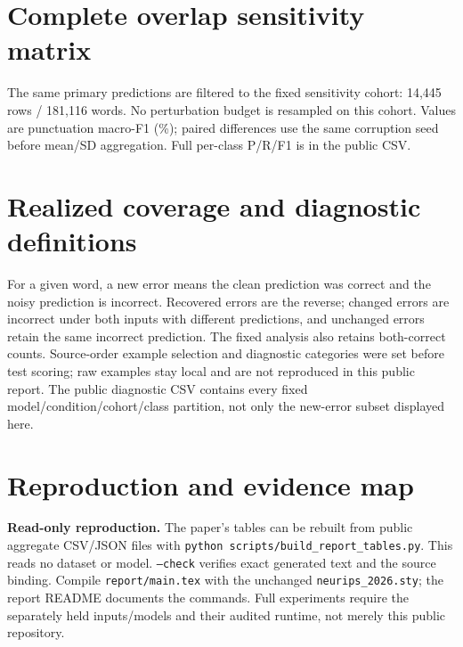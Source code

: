 \documentclass{article}
\begin{document}
\clearpage
\appendix
\section{Complete overlap sensitivity matrix}\label{app:sensitivity}
The same primary predictions are filtered to the fixed sensitivity cohort:
14,445 rows / 181,116 words. No perturbation budget is resampled on this cohort.
Values are punctuation macro-F1 (\%); paired differences use the same corruption
seed before mean/SD aggregation. Full per-class P/R/F1 is in the public CSV.
\begin{table}[h]
\centering\small
\caption{All sensitivity conditions. $\Delta$ is Augmented minus Clean (pp).}
\SensitivityResults
\end{table}

\section{Realized coverage and diagnostic definitions}
\begin{table}[h]
\centering\small
\caption{Primary realized union/full-endpoint word coverage. Single-family
2/5/10\% budgets use 3,629/9,074/18,148 words independently.}
\CoverageResults
\end{table}

\begin{table}[h]
\centering\small
\caption{New word-class errors relative to each model's own clean prediction,
primary/seed586. Context means an unchanged word inside an edited row. All four
reference classes, including O, enter these diagnostic counts.}
\label{tab:diagnostics}
\DiagnosticResults
\end{table}

For a given word, a new error means the clean prediction was correct and the
noisy prediction is incorrect. Recovered errors are the reverse; changed errors
are incorrect under both inputs with different predictions, and unchanged errors
retain the same incorrect prediction. The fixed analysis also retains both-correct
counts. Source-order example selection and diagnostic categories were set before
test scoring; raw examples stay local and are not reproduced in this public report.
The public diagnostic CSV contains every fixed model/condition/cohort/class
partition, not only the new-error subset displayed here.

\section{Reproduction and evidence map}
\textbf{Read-only reproduction.} The paper's tables can be rebuilt from public
aggregate CSV/JSON files with \texttt{python scripts/build\_report\_tables.py}.
This reads no dataset or model. \texttt{--check} verifies exact generated text
and the source binding. Compile \texttt{report/main.tex} with the unchanged
\texttt{neurips\_2026.sty}; the report README documents the commands. Full
experiments require the separately held inputs/models and their audited runtime,
not merely this public repository.
\end{document}
